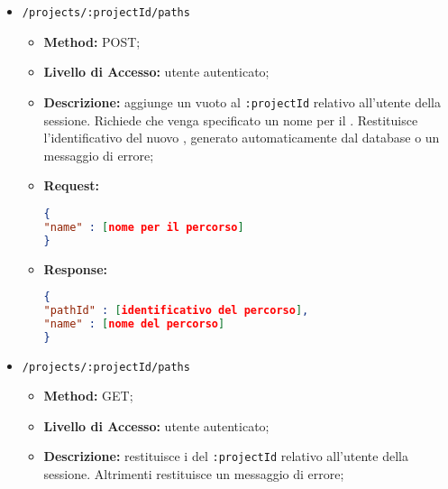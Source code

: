 \begin{itemize}
\begin{itemize}
\item \textbf{Method:} DELETE;
\item \textbf{Livello di Accesso:} utente autenticato;
\item \textbf{Descrizione:} elimina una relazione di tipo associazione nel  \texttt{:projectId}, relativo all'utente della sessione. Richiede gli identificativi dei nodi che formano l'associazione. Restituisce un messaggio di conferma oppure un messaggio di errore;
\item \textbf{Request:}
\begin{lstlisting}[language=json,firstnumber=1]
{
"associationId" : [identificativo dell'associazione creata]
}
\end{lstlisting}
\end{itemize}
\item \texttt{/projects/:projectId/paths}
\begin{itemize}
\item \textbf{Method:} POST;
\item \textbf{Livello di Accesso:} utente autenticato;
\item \textbf{Descrizione:} aggiunge un  vuoto al  \texttt{:projectId} relativo all'utente della sessione. Richiede che venga specificato un nome per il . Restituisce l'identificativo del nuovo , generato automaticamente dal database o un messaggio di errore;
\item \textbf{Request:}
\begin{lstlisting}[language=json,firstnumber=1]
{
"name" : [nome per il percorso]
}
\end{lstlisting}
\item \textbf{Response:}
\begin{lstlisting}[language=json,firstnumber=1]
{
"pathId" : [identificativo del percorso],
"name" : [nome del percorso]
}
\end{lstlisting}
\end{itemize}
\item \texttt{/projects/:projectId/paths}
\begin{itemize}
\item \textbf{Method:} GET;
\item \textbf{Livello di Accesso:} utente autenticato;
\item \textbf{Descrizione:} restituisce i  del  \texttt{:projectId} relativo all'utente della sessione. Altrimenti restituisce un messaggio di errore;

\end{itemize}
\end{itemize}
